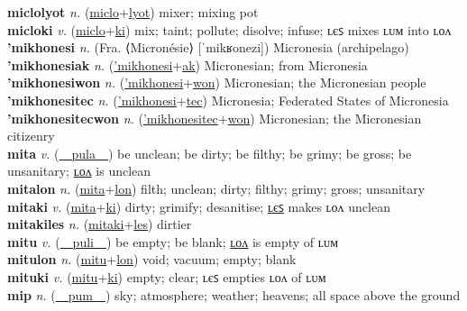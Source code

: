 \textbf{miclolyot} \textit{n.} (\hyperref[miclo]{miclo}+\hyperref[lyot]{lyot})
mixer; mixing pot \label{miclolyot} \\
\textbf{micloki} \textit{v.} (\hyperref[miclo]{miclo}+\hyperref[ki]{ki})
mix; taint; pollute; disolve; infuse; ʟєꜱ mixes ʟᴜᴍ into ʟᴏᴧ \label{micloki} \\
\textbf{'mikhonesi} \textit{n.} (Fra. ⟨Micronésie⟩ [ˈmikʁonezi])
Micronesia (archipelago) \label{'mikhonesi} \\
\textbf{'mikhonesiak} \textit{n.} (\hyperref['mikhonesi]{'mikhonesi}+\hyperref[ak]{ak})
Micronesian; from Micronesia \label{'mikhonesiak} \\
\textbf{'mikhonesiwon} \textit{n.} (\hyperref['mikhonesi]{'mikhonesi}+\hyperref[won]{won})
Micronesian; the Micronesian people \label{'mikhonesiwon} \\
\textbf{'mikhonesitec} \textit{n.} (\hyperref['mikhonesi]{'mikhonesi}+\hyperref[tec]{tec})
Micronesia; Federated States of Micronesia \label{'mikhonesitec} \\
\textbf{'mikhonesitecwon} \textit{n.} (\hyperref['mikhonesitec]{'mikhonesitec}+\hyperref[won]{won})
Micronesian; the Micronesian citizenry \label{'mikhonesitecwon} \\
\textbf{mita} \textit{v.} (\hyperref[pula]{~~pula~~})
be unclean; be dirty; be filthy; be grimy; be gross; be unsanitary; \hyperref[mitalon]{ʟᴏᴧ} is unclean \label{mita} \\
\textbf{mitalon} \textit{n.} (\hyperref[mita]{mita}+\hyperref[lon]{lon})
filth; unclean; dirty; filthy; grimy; gross; unsanitary \label{mitalon} \\
\textbf{mitaki} \textit{v.} (\hyperref[mita]{mita}+\hyperref[ki]{ki})
dirty; grimify; desanitise; \hyperref[mitakiles]{ʟєꜱ} makes ʟᴏᴧ unclean \label{mitaki} \\
\textbf{mitakiles} \textit{n.} (\hyperref[mitaki]{mitaki}+\hyperref[les]{les})
dirtier \label{mitakiles} \\
\textbf{mitu} \textit{v.} (\hyperref[puli]{~~puli~~})
be empty; be blank; \hyperref[mitulon]{ʟᴏᴧ} is empty of ʟᴜᴍ \label{mitu} \\
\textbf{mitulon} \textit{n.} (\hyperref[mitu]{mitu}+\hyperref[lon]{lon})
void; vacuum; empty; blank \label{mitulon} \\
\textbf{mituki} \textit{v.} (\hyperref[mitu]{mitu}+\hyperref[ki]{ki})
empty; clear; ʟєꜱ empties ʟᴏᴧ of ʟᴜᴍ \label{mituki} \\
\textbf{mip} \textit{n.} (\hyperref[pum]{~~pum~~})
sky; atmosphere; weather; heavens; all space above the ground \label{mip} \\
